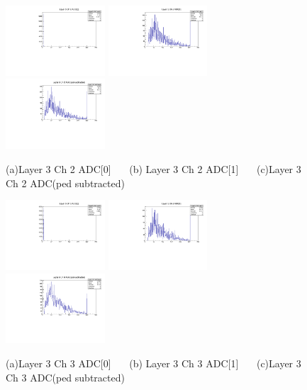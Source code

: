 \documentclass[a4paper,11pt]{article}
\theoremstyle{mytheor}
\begin{document}
\begin{figure}[H] 
\vspace*{-0.3cm} 
\includegraphics[width=0.33\textwidth,scale=0.5,trim=0 0 0 0,clip]{plotsdir/file0_muons-Layer3_Ch2_adc0-1.pdf} 
\includegraphics[width=0.33\textwidth,scale=0.5,trim=0 0 0 0,clip]{plotsdir/file0_muons-Layer3_Ch2_adc1-1.pdf} 
\includegraphics[width=0.33\textwidth,scale=0.5,trim=0 0 0 0,clip]{plotsdir/file0_muons-Layer3_Ch2_adcPedsub-1.pdf} 
\caption{(a)Layer 3 Ch 2 ADC[0] ~~~(b) Layer 3 Ch 2 ADC[1] ~~~(c)Layer 3 Ch 2 ADC(ped subtracted) } 
\end{figure} 
\begin{figure}[H] 
\vspace*{-0.3cm} 
\includegraphics[width=0.33\textwidth,scale=0.5,trim=0 0 0 0,clip]{plotsdir/file0_muons-Layer3_Ch3_adc0-1.pdf} 
\includegraphics[width=0.33\textwidth,scale=0.5,trim=0 0 0 0,clip]{plotsdir/file0_muons-Layer3_Ch3_adc1-1.pdf} 
\includegraphics[width=0.33\textwidth,scale=0.5,trim=0 0 0 0,clip]{plotsdir/file0_muons-Layer3_Ch3_adcPedsub-1.pdf} 
\caption{(a)Layer 3 Ch 3 ADC[0] ~~~(b) Layer 3 Ch 3 ADC[1] ~~~(c)Layer 3 Ch 3 ADC(ped subtracted) } 
\end{figure} 
\end{document}
